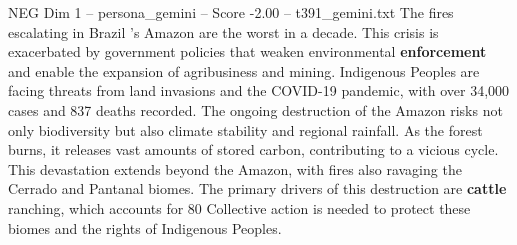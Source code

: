 \begin{textsample}{NEG Dim 1 – persona\_gemini – Score -2.00 – t391\_gemini.txt}  \label{ex:f1_neg_003}
The fires escalating in Brazil 's Amazon are the worst in a decade.
This crisis is exacerbated by government policies that weaken environmental \textbf{enforcement} and enable the expansion of agribusiness and mining.
Indigenous Peoples are facing threats from land invasions and the COVID-19 pandemic, with over 34,000 cases and 837 deaths recorded.
The ongoing destruction of the Amazon risks not only biodiversity but also climate stability and regional rainfall.
As the forest burns, it releases vast amounts of stored carbon, contributing to a vicious cycle.
This devastation extends beyond the Amazon, with fires also ravaging the Cerrado and Pantanal biomes.
The primary drivers of this destruction are \textbf{cattle} ranching, which accounts for 80 %
Collective action is needed to protect these biomes and the rights of Indigenous Peoples.

\end{textsample}
